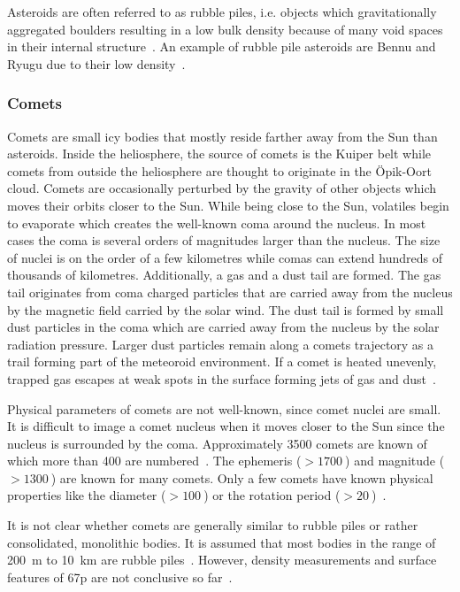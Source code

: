 Asteroids are often referred to as rubble piles, i.e. objects which gravitationally aggregated boulders resulting in a low bulk density because of many void spaces in their internal structure~\cite{Richardson2002GravitationalEvolution}. An example of rubble pile asteroids are Bennu and Ryugu due to their low density~\cite{Chesley2014OrbitBennu, Watanabe2019Hayabusa2Pile}.

\subsubsection{Comets}
Comets are small icy bodies that mostly reside farther away from the Sun than asteroids. Inside the heliosphere, the source of comets is the Kuiper belt while comets from outside the heliosphere are thought to originate in the \"Opik-Oort cloud. Comets are occasionally perturbed by the gravity of other objects which moves their orbits closer to the Sun. While being close to the Sun, volatiles begin to evaporate which creates the well-known coma around the nucleus. In most cases the coma is several orders of magnitudes larger than the nucleus. The size of nuclei is on the order of a few kilometres while comas can extend hundreds of thousands of kilometres. Additionally, a gas and a dust tail are formed. The gas tail originates from coma charged particles that are carried away from the nucleus by the magnetic field carried by the solar wind. The dust tail is formed by small dust particles in the coma which are carried away from the nucleus by the solar radiation pressure. Larger dust particles remain along a comets trajectory as a trail forming part of the meteoroid environment. If a comet is heated unevenly, trapped gas escapes at weak spots in the surface forming jets of gas and dust~\cite{Comets, a2017comets, Soja2019IMEM2:System}.

Physical parameters of comets are not well-known, since comet nuclei are small. It is difficult to image a comet nucleus when it moves closer to the Sun since the nucleus is surrounded by the coma. Approximately \SI{3500}{} comets are known of which more than \SI{400}{} are numbered~\cite{JPLEngine}. The ephemeris ($> \SI{1700}{}$) and magnitude ($>\SI{1300}{}$) are known for many comets. Only a few comets have known physical properties like the diameter ($> \SI{100}{}$) or the rotation period ($> \SI{20}{}$)~\cite{JPLEngine}.

It is not clear whether comets are generally similar to rubble piles or rather consolidated, monolithic bodies. It is assumed that most bodies in the range of \SI{200}{\meter} to \SI{10}{\kilo\meter} are rubble piles~\cite{Walsh2018RubbleAsteroids}. However, density measurements and surface features of \gls{67p} are not conclusive so far~\cite{Weissman2020OriginNuclei}. 

